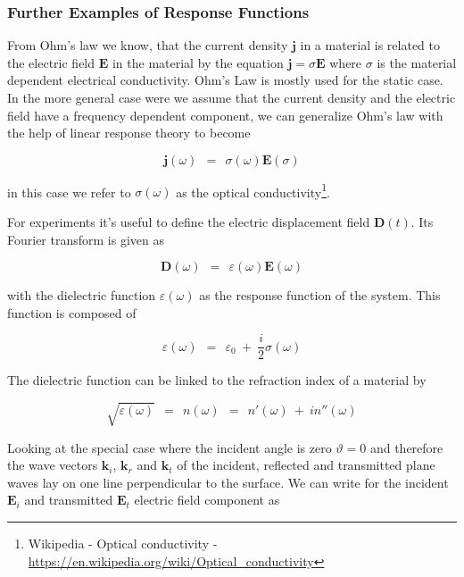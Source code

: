 \documentclass[10pt]{report}
\numberwithin{equation}{chapter}
\newcommand{\vc}[1]{ %
  \mathbf{#1}
}
\begin{document}
\subsubsection{Further Examples of Response Functions}

From Ohm's law we know, that the current density $\vc{j}$ in a material is related to the electric field $\vc{E}$ in the material by the equation $\vc{j} = \sigma \vc{E}$ where $\sigma$ is the material dependent electrical conductivity. Ohm's Law is mostly used for the static case. 
In the more general case were we assume that the current density and the electric field have a frequency dependent component, we can generalize Ohm's law with the help of linear response theory to become

\begin{equation}
  \vc{j}(\omega) ~~=~~ \sigma(\omega) \vc{E}(\sigma)
\end{equation}

in this case we refer to $\sigma(\omega)$ as the optical conductivity\footnote{Wikipedia - Optical conductivity - \url{https://en.wikipedia.org/wiki/Optical_conductivity}}.

For experiments it's useful to define the electric displacement field $\vc{D}(t)$. Its Fourier transform is given as

\begin{equation}
  \vc{D}(\omega) ~~=~~ \varepsilon(\omega) \vc{E}(\omega)
\end{equation}

with the dielectric function $\varepsilon(\omega)$ as the response function of the system. This function is composed of 

\begin{equation}
  \varepsilon(\omega) ~~=~~ \varepsilon_0 ~+~ \frac{i}{2}\sigma(\omega)
\end{equation}

The dielectric function can be linked to the refraction index of a material by

\begin{equation} \label{eq:refrac_index}
  \sqrt{\varepsilon(\omega)} ~~=~~ n(\omega) ~~=~~ n'(\omega) ~+~ in''(\omega)
\end{equation}


Looking at the special case where the incident angle is zero $\vartheta = 0$ and therefore the wave vectors $\vc{k}_i$, $\vc{k}_r$ and $\vc{k}_t$ of the incident, reflected and transmitted plane waves lay on one line perpendicular to the surface. We can write for the incident $\vc{E}_i$ and transmitted $\vc{E}_t$ electric field component as
\end{document}
